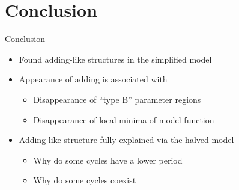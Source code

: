 \section{Conclusion}

\begin{frame}{Conclusion}
	\begin{itemize}
		\item Found adding-like structures in the simplified model
		      \pause
		\item Appearance of adding is associated with
		      \begin{itemize}
			      \item Disappearance of ``type B'' parameter regions
			      \item Disappearance of local minima of model function
		      \end{itemize}
		      \pause
		\item Adding-like structure fully explained via the halved model
		      \begin{itemize}
			      \item Why do some cycles have a lower period
			      \item Why do some cycles coexist
		      \end{itemize}
	\end{itemize}
\end{frame}
